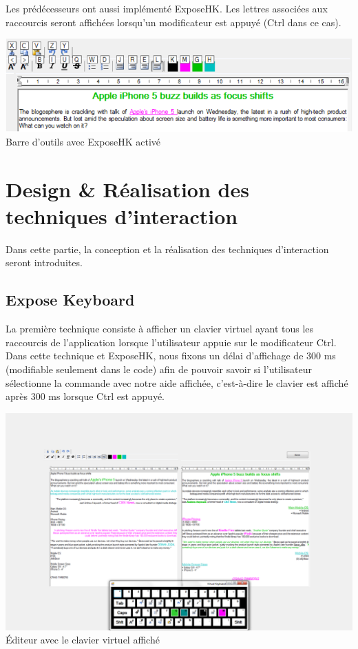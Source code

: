 \documentclass[12pt,a4paper]{article}
\begin{document}
Les prédécesseurs ont aussi implémenté ExposeHK. Les lettres associées aux raccourcis seront affichées lorsqu'un modificateur est appuyé (Ctrl dans ce cas).
\begin{center}
	\includegraphics[width=1\linewidth]{HK.png}
	Barre d'outils avec ExposeHK activé
\end{center}
\section{Design \& Réalisation des techniques d'interaction}
Dans cette partie, la conception et la réalisation des techniques d'interaction seront introduites.
\subsection{Expose Keyboard}
La première technique consiste à afficher un clavier virtuel ayant tous les raccourcis de l'application lorsque l'utilisateur appuie sur le modificateur Ctrl. Dans cette technique et ExposeHK, nous fixons un délai d'affichage de 300 ms (modifiable seulement dans le code) afin de pouvoir savoir si l'utilisateur sélectionne la commande avec notre aide affichée, c'est-à-dire le clavier est affiché après 300 ms lorsque Ctrl est appuyé.
\begin{center}
	\includegraphics[width=1\linewidth]{Edit.png}
	Éditeur avec le clavier virtuel affiché
\end{center}
\end{document}
